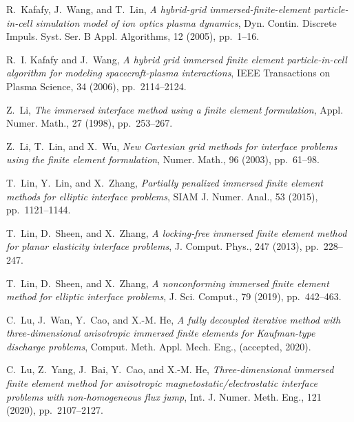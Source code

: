\documentclass{siamart171218}
\begin{document}
\begin{thebibliography}{99}
{\sc R.~Kafafy, J.~Wang, and T.~Lin}, {\em A hybrid-grid
  immersed-finite-element particle-in-cell simulation model of ion optics
  plasma dynamics}, Dyn. Contin. Discrete Impuls. Syst. Ser. B Appl.
  Algorithms, 12 (2005), pp.~1--16.

{\sc R.~I. Kafafy and J.~Wang}, {\em A hybrid grid immersed finite element
  particle-in-cell algorithm for modeling spacecraft-plasma interactions}, IEEE
  Transactions on Plasma Science, 34 (2006), pp.~2114--2124.

{\sc Z.~Li}, {\em The immersed interface method using a finite element
  formulation}, Appl. Numer. Math., 27 (1998), pp.~253--267.

{\sc Z.~Li, T.~Lin, and X.~Wu}, {\em New {C}artesian grid methods for interface
  problems using the finite element formulation}, Numer. Math., 96 (2003),
  pp.~61--98.

{\sc T.~Lin, Y.~Lin, and X.~Zhang}, {\em Partially penalized immersed finite
  element methods for elliptic interface problems}, SIAM J. Numer. Anal., 53
  (2015), pp.~1121--1144.

{\sc T.~Lin, D.~Sheen, and X.~Zhang}, {\em A locking-free immersed finite
  element method for planar elasticity interface problems}, J. Comput. Phys.,
  247 (2013), pp.~228--247.

{\sc T.~Lin, D.~Sheen, and X.~Zhang}, {\em {A nonconforming immersed finite
  element method for elliptic interface problems}}, J. Sci. Comput., 79 (2019),
  pp.~442--463.

{\sc C.~Lu, J.~Wan, Y.~Cao, and X.-M. He}, {\em {A fully decoupled iterative
  method with three-dimensional anisotropic immersed finite elements for
  Kaufman-type discharge problems}}, Comput. Meth. Appl. Mech. Eng.,
  (accepted, 2020).

{\sc C.~Lu, Z.~Yang, J.~Bai, Y.~Cao, and X.-M. He}, {\em {Three-dimensional
  immersed finite element method for anisotropic magnetostatic/electrostatic
  interface problems with non-homogeneous flux jump}}, Int. J. Numer. Meth.
  Eng., 121 (2020), pp.~2107--2127.


\end{thebibliography}
\end{document}

